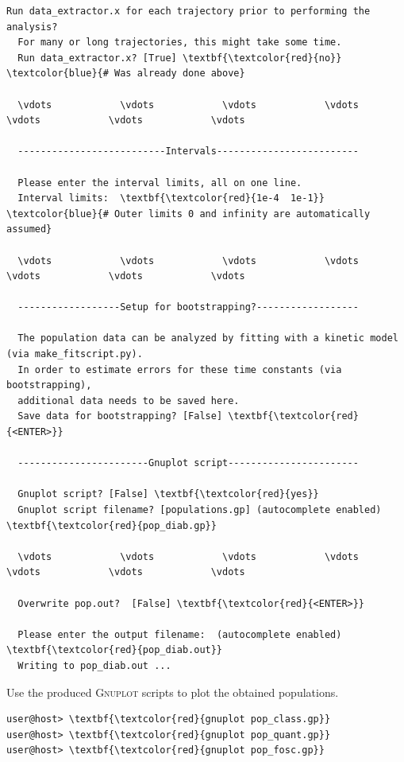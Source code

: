 \documentclass[a4paper,11pt,DIV=15,openany]{scrbook}
\begin{document}
\begin{oframed}
\begin{Verbatim}[commandchars=\\\{\}]
  Run data_extractor.x for each trajectory prior to performing the analysis?
  For many or long trajectories, this might take some time.
  Run data_extractor.x? [True] \textbf{\textcolor{red}{no}}          \textcolor{blue}{# Was already done above}
  
  \vdots            \vdots            \vdots            \vdots            \vdots            \vdots            \vdots            
  
  --------------------------Intervals-------------------------
  
  Please enter the interval limits, all on one line.
  Interval limits:  \textbf{\textcolor{red}{1e-4  1e-1}}          \textcolor{blue}{# Outer limits 0 and infinity are automatically assumed}
  
  \vdots            \vdots            \vdots            \vdots            \vdots            \vdots            \vdots            
  
  ------------------Setup for bootstrapping?------------------
  
  The population data can be analyzed by fitting with a kinetic model (via make_fitscript.py). 
  In order to estimate errors for these time constants (via bootstrapping), 
  additional data needs to be saved here.
  Save data for bootstrapping? [False] \textbf{\textcolor{red}{<ENTER>}}
  
  -----------------------Gnuplot script-----------------------
  
  Gnuplot script? [False] \textbf{\textcolor{red}{yes}}
  Gnuplot script filename? [populations.gp] (autocomplete enabled) \textbf{\textcolor{red}{pop_diab.gp}}
  
  \vdots            \vdots            \vdots            \vdots            \vdots            \vdots            \vdots            
  
  Overwrite pop.out?  [False] \textbf{\textcolor{red}{<ENTER>}}
  
  Please enter the output filename:  (autocomplete enabled) \textbf{\textcolor{red}{pop_diab.out}}
  Writing to pop_diab.out ...
  \end{Verbatim}
  \end{oframed}

\normalsize
Use the produced \textsc{Gnuplot} scripts to plot the obtained populations.
\begin{Verbatim}[commandchars=\\\{\}]
user@host> \textbf{\textcolor{red}{gnuplot pop_class.gp}}
user@host> \textbf{\textcolor{red}{gnuplot pop_quant.gp}}
user@host> \textbf{\textcolor{red}{gnuplot pop_fosc.gp}}
\end{Verbatim}
\end{document}
